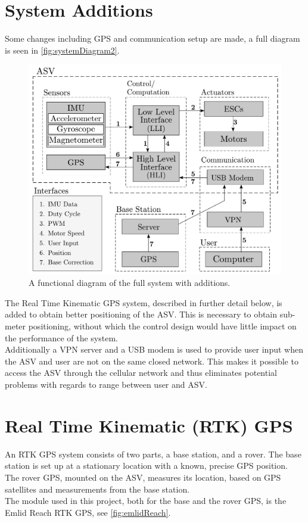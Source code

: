 \section{System Additions}
Some changes including GPS and communication setup are made, a full diagram is seen in \autoref{fig:systemDiagram2}.
%
\begin{figure}[H]
  \includegraphics[width=.65\textwidth]{figures/systemDiagram5}
  \caption{A functional diagram of the full system with additions.}
  \label{fig:systemDiagram2}
\end{figure}
%
The Real Time Kinematic GPS system, described in further detail below, is added to obtain better positioning of the ASV. This is necessary to obtain sub-meter positioning, without which the control design would have little impact on the performance of the system.\\
Additionally a VPN server and a USB modem is used to provide user input when the ASV and user are not on the same closed network. This makes it possible to access the ASV through the cellular network and thus eliminates potential problems with regards to range between user and ASV.

\section{Real Time Kinematic (RTK) GPS}
An RTK GPS system consists of two parts, a base station, and a rover.
The base station is set up at a stationary location with a known, precise GPS position.\\
The rover GPS, mounted on the ASV, measures its location, based on GPS satellites and measurements from the base station.\cite{EmlidRTK}\\
The module used in this project, both for the base and the rover GPS, is the Emlid Reach RTK GPS, see \autoref{fig:emlidReach}.

